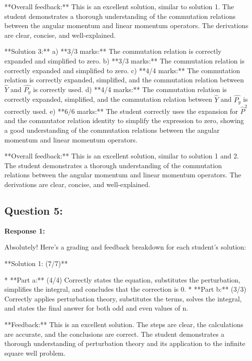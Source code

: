 \documentclass[a4paper,11pt]{article}
\begin{document}
**Overall feedback:** This is an excellent solution, similar to solution 1. The student demonstrates a thorough understanding of the commutation relations between the angular momentum and linear momentum operators. The derivations are clear, concise, and well-explained.

**Solution 3:**
a) **3/3 marks:** The commutation relation is correctly expanded and simplified to zero.
b) **3/3 marks:** The commutation relation is correctly expanded and simplified to zero.
c) **4/4 marks:** The commutation relation is correctly expanded, simplified, and the commutation relation between \( \hat{Y} \) and \( \hat{P_{y}} \) is correctly used.
d) **4/4 marks:** The commutation relation is correctly expanded, simplified, and the commutation relation between \( \hat{Y} \) and \( \hat{P_{y}} \) is correctly used.
e) **6/6 marks:** The student correctly uses the expansion for \( \hat{P}^{2} \) and the commutator relation identity to simplify the expression to zero, showing a good understanding of the commutation relations between the angular momentum and linear momentum operators.

**Overall feedback:** This is an excellent solution, similar to solution 1 and 2. The student demonstrates a thorough understanding of the commutation relations between the angular momentum and linear momentum operators. The derivations are clear, concise, and well-explained.



\subsection*{Question 5:}

\textbf{Response 1:}

Absolutely! Here's a grading and feedback breakdown for each student's solution:

**Solution 1: (7/7)**

*   **Part a:** (4/4) Correctly states the equation, substitutes the perturbation, simplifies the integral, and concludes that the correction is 0.
*   **Part b:** (3/3) Correctly applies perturbation theory, substitutes the terms, solves the integral, and states the final answer for both odd and even values of n.

**Feedback:** This is an excellent solution. The steps are clear, the calculations are accurate, and the conclusions are correct. The student demonstrates a thorough understanding of perturbation theory and its application to the infinite square well problem.
\end{document}
